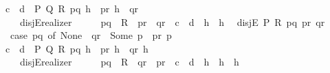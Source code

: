 \begin{isabellebody}
\ \ \ \ {\isachardoublequoteopen}\isactrlbold {\isasymlambda}{\isacharparenleft}{\kern0pt}c{\isacharcolon}{\kern0pt}\ {\isacharunderscore}{\kern0pt}{\isacharparenright}{\kern0pt}\ {\isacharparenleft}{\kern0pt}d{\isacharcolon}{\kern0pt}\ {\isacharunderscore}{\kern0pt}{\isacharparenright}{\kern0pt}\ P\ Q\ R\ pq\ {\isacharparenleft}{\kern0pt}h{}{\isacharcolon}{\kern0pt}\ {\isacharunderscore}{\kern0pt}{\isacharparenright}{\kern0pt}\ pr\ {\isacharparenleft}{\kern0pt}h{}{\isacharcolon}{\kern0pt}\ {\isacharunderscore}{\kern0pt}{\isacharparenright}{\kern0pt}\ qr{\isachardot}{\kern0pt}\isanewline
\ \ \ \ \ \ \ disjE{\isacharunderscore}{\kern0pt}realizer{}\ {\isasymcdot}\ {\isacharunderscore}{\kern0pt}\ {\isasymcdot}\ {\isacharunderscore}{\kern0pt}\ {\isasymcdot}\ pq\ {\isasymcdot}\ R\ {\isasymcdot}\ pr\ {\isasymcdot}\ qr\ {\isasymbullet}\ c\ {\isasymbullet}\ d\ {\isasymbullet}\ h{}\ {\isasymbullet}\ h{}{\isachardoublequoteclose}\isanewline
\isanewline
\ \ disjE\ {\isacharparenleft}{\kern0pt}P{\isacharcomma}{\kern0pt}\ R{\isacharparenright}{\kern0pt}{\isacharcolon}{\kern0pt}\ {\isachardoublequoteopen}{\isasymlambda}pq\ pr\ qr{\isachardot}{\kern0pt}\isanewline
\ \ \ \ \ {\isacharparenleft}{\kern0pt}case\ pq\ of\ None\ {\isasymRightarrow}\ qr\ {\isacharbar}{\kern0pt}\ Some\ p\ {\isasymRightarrow}\ pr\ p{\isacharparenright}{\kern0pt}{\isachardoublequoteclose}\isanewline
\ \ \ \ {\isachardoublequoteopen}\isactrlbold {\isasymlambda}{\isacharparenleft}{\kern0pt}c{\isacharcolon}{\kern0pt}\ {\isacharunderscore}{\kern0pt}{\isacharparenright}{\kern0pt}\ {\isacharparenleft}{\kern0pt}d{\isacharcolon}{\kern0pt}\ {\isacharunderscore}{\kern0pt}{\isacharparenright}{\kern0pt}\ P\ Q\ R\ pq\ {\isacharparenleft}{\kern0pt}h{}{\isacharcolon}{\kern0pt}\ {\isacharunderscore}{\kern0pt}{\isacharparenright}{\kern0pt}\ pr\ {\isacharparenleft}{\kern0pt}h{}{\isacharcolon}{\kern0pt}\ {\isacharunderscore}{\kern0pt}{\isacharparenright}{\kern0pt}\ qr\ {\isacharparenleft}{\kern0pt}h{}{\isacharcolon}{\kern0pt}\ {\isacharunderscore}{\kern0pt}{\isacharparenright}{\kern0pt}{\isachardot}{\kern0pt}\isanewline
\ \ \ \ \ \ \ disjE{\isacharunderscore}{\kern0pt}realizer{}\ {\isasymcdot}\ {\isacharunderscore}{\kern0pt}\ {\isasymcdot}\ {\isacharunderscore}{\kern0pt}\ {\isasymcdot}\ pq\ {\isasymcdot}\ R\ {\isasymcdot}\ qr\ {\isasymcdot}\ pr\ {\isasymbullet}\ c\ {\isasymbullet}\ d\ {\isasymbullet}\ h{}\ {\isasymbullet}\ h{}\ {\isasymbullet}\ h{}{\isachardoublequoteclose}\isanewline

\end{isabellebody}
